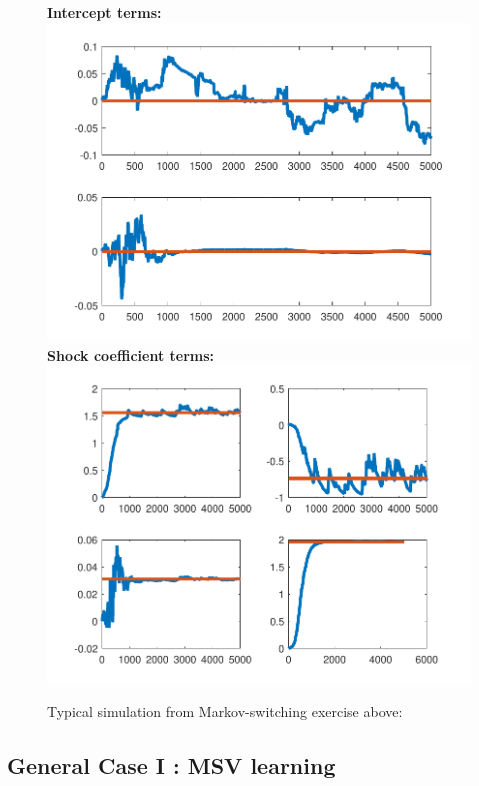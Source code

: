 \documentclass[12pt,reqno]{article}
\numberwithin{equation}{section}
\begin{document}
\begin{figure}[H]
\caption{Typical simulation from Markov-switching exercise above:} 
\textbf{Intercept terms:} \\
\includegraphics[scale=0.4]{MS_simulation_alphas.pdf}\\
\textbf{Shock coefficient terms: } \\
\includegraphics[scale=0.4]{MS_simulation_shockCoef.pdf}\\
\end{figure}

\subsection*{General Case I : MSV learning} 
\end{document}
